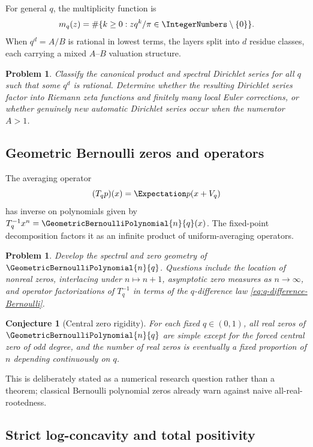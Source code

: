 \documentclass[11pt,oneside]{article}
\newtheorem{conjecture}[theorem]{Conjecture}
\newtheorem{problem}[theorem]{Problem}
\theoremstyle{definition}
\theoremstyle{remark}
\begin{document}
For general $q$, the multiplicity function is
\[
 m_q(z)=\#\{k\ge0:zq^k/\pi\in\IntegerNumbers\setminus\{0\}\}.
\]
When $q^d=A/B$ is rational in lowest terms, the layers split into $d$ residue classes,
each carrying a mixed $A$--$B$ valuation structure.

\begin{problem}
Classify the canonical product and spectral Dirichlet series for all $q$ such that some
$q^d$ is rational.  Determine whether the resulting Dirichlet series factor into
Riemann zeta functions and finitely many local Euler corrections, or whether genuinely
new automatic Dirichlet series occur when the numerator $A>1$.
\end{problem}

\subsection{Geometric Bernoulli zeros and operators}

The averaging operator
\[
 (T_qp)(x)=\Expectation p(x+V_q)
\]
has inverse on polynomials given by $T_q^{-1}x^n=\GeometricBernoulliPolynomial{n}{q}(x)$.  The fixed-point
decomposition factors it as an infinite product of uniform-averaging operators.

\begin{problem}
Develop the spectral and zero geometry of $\GeometricBernoulliPolynomial{n}{q}$.  Questions include the
location of nonreal zeros, interlacing under $n\mapsto n+1$, asymptotic zero measures as
$n\to\infty$, and operator factorizations of $T_q^{-1}$ in terms of the $q$-difference
law \eqref{eq:q-difference-Bernoulli}.
\end{problem}

\begin{conjecture}[Central zero rigidity]
For each fixed $q\in(0,1)$, all real zeros of $\GeometricBernoulliPolynomial{n}{q}$ are simple except for the
forced central zero of odd degree, and the number of real zeros is eventually a fixed
proportion of $n$ depending continuously on $q$.
\end{conjecture}

This is deliberately stated as a numerical research question rather than a theorem;
classical Bernoulli polynomial zeros already warn against naive all-real-rootedness.

\subsection{Strict log-concavity and total positivity}
\end{document}
